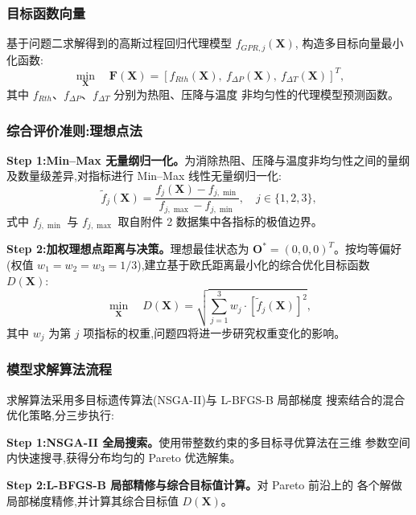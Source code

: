 \subsubsection{目标函数向量}

基于问题二求解得到的高斯过程回归代理模型 $f_{GPR, j}(\mathbf{X})$,
构造多目标向量最小化函数:
\begin{equation}
  \min_{\mathbf{X}} \quad \mathbf{F}(\mathbf{X}) =
  \left[ f_{Rth}(\mathbf{X}),\ f_{\Delta P}(\mathbf{X}),\
    f_{\Delta T}(\mathbf{X}) \right]^T,
  \label{eq:q3-objective}
\end{equation}
其中 $f_{Rth}$、$f_{\Delta P}$、$f_{\Delta T}$ 分别为热阻、压降与温度
非均匀性的代理模型预测函数。

\subsubsection{综合评价准则:理想点法}

\textbf{Step 1:Min--Max 无量纲归一化。}为消除热阻、压降与温度非均匀性之间的量纲及数量级差异,对指标进行
Min--Max 线性无量纲归一化:
\begin{equation}
  \tilde{f}_j(\mathbf{X}) = \frac{f_j(\mathbf{X}) - f_{j,\min}}
  {f_{j,\max} - f_{j,\min}}, \quad j \in \{1, 2, 3\},
  \label{eq:minmax}
\end{equation}
式中 $f_{j,\min}$ 与 $f_{j,\max}$ 取自附件 2 数据集中各指标的极值边界。

\textbf{Step 2:加权理想点距离与决策。}理想最佳状态为 $\mathbf{O}^* = (0, 0, 0)^T$。按均等偏好(权值
$w_1 = w_2 = w_3 = 1/3$),建立基于欧氏距离最小化的综合优化目标函数
$D(\mathbf{X})$:
\begin{equation}
  \min_{\mathbf{X}} \quad D(\mathbf{X}) =
  \sqrt{ \sum_{j=1}^{3} w_j \cdot
    \left[ \tilde{f}_j(\mathbf{X}) \right]^2 },
  \label{eq:topsis}
\end{equation}
其中 $w_j$ 为第 $j$ 项指标的权重,问题四将进一步研究权重变化的影响。

\subsubsection{模型求解算法流程}

求解算法采用多目标遗传算法(NSGA-II)\cite{Deb2002}与 L-BFGS-B 局部梯度
搜索\cite{Byrd1995,Chen2005}结合的混合优化策略,分三步执行:

\textbf{Step 1:NSGA-II 全局搜索。}使用带整数约束的多目标寻优算法在三维
参数空间内快速搜寻,获得分布均匀的 Pareto 优选解集。

\textbf{Step 2:L-BFGS-B 局部精修与综合目标值计算。}对 Pareto 前沿上的
各个解做局部梯度精修,并计算其综合目标值 $D(\mathbf{X})$。

